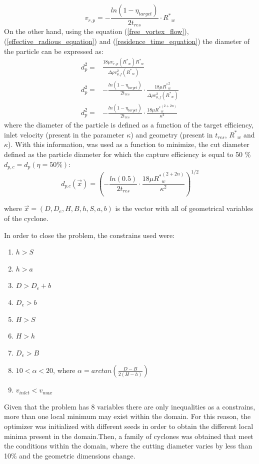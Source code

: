 \begin{equation}
	v_{r,p}= - \frac{ln(1-\eta_{target})}{2 t_{res}} \cdot {R^*} _w
\end{equation}
On the other hand, using the equation (\ref{free_vortex_flow}), (\ref{effective_radious_equation}) and  (\ref{residence_time_equation})  the diameter of the particle can be expressed as:
\begin{align}
	d_p ^2 =&   \frac{18 \mu	v_{r,p}({R^*} _w) {R^*} _w}{\Delta \rho v_{\theta,f} ^2 ({R^*} _w)} \\
	d_p ^2 =&  - \frac{ln(1-\eta_{target})}{2 t_{res}} \cdot \frac{18 \mu {R^*} _w^2}{\Delta \rho v_{\theta,f}^2({R^*} _w) }\\
	d_p ^2 =&  - \frac{ln(1-\eta_{target})}{2 t_{res}} \cdot \frac{18 \mu {R^*} _w^{(2+2n)}}{\kappa^2 }
\end{align}
where the diameter of the particle is defined as a function of the target efficiency, inlet velocity (present in the parameter $\kappa$) and geometry (present in $t_{res}$, ${R^*}_w$ and $\kappa$). With this information, was used as a function to minimize,  the cut diameter defined as  the particle diameter for which the capture efficiency is equal to 50 \% $d_{p,c}=d_p(\eta=50 \%)$:
\begin{equation}
	d_{p.c} (\vec{x})  =  \left(  -  \frac{ln(0.5)}{2 t_{res}} \cdot \frac{18 \mu {R^*} _w^{(2+2n)}}{\kappa^2 }  \right)^{1/2}
\end{equation}

where $\vec{x}=(D,D_e,H,B,h,S,a,b)$ is the vector with all of geometrical variables of the cyclone.

In order to close the problem, the constrains used were:
\begin{enumerate}
	\item $h>S$
	\item $h>a$
	\item $D>D_e+b$
	\item $D_e>b$
	\item $H>S$
	\item $H>h$
	\item $D_e>B$
	\item $10$\textdegree $<\alpha<20$\textdegree , where $\alpha= arctan \left(  \frac{D-B}{2(H-h)} \right) $
	\item $v_{inlet} < v_{max}$
\end{enumerate}

Given that the problem has 8 variables  there are only inequalities as a constrains, more than one local minimum may exist within the domain. For this reason, the optimizer was  initialized with  different seeds in order to obtain the different local minima present in the domain.Then, a family of cyclones was obtained that meet the conditions within the domain, where the cutting diameter varies by less than 10\% and the geometric dimensions change. 



